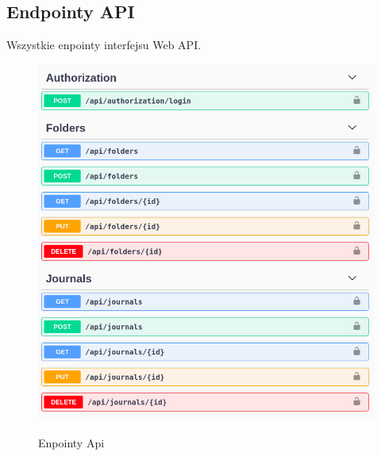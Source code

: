 \documentclass[a4paper,11pt]{report}
\begin{document}
\subsection{Endpointy API}
Wszystkie enpointy interfejsu Web API.
\begin{figure}[H]
	\centering
	\includegraphics[scale=0.5]{implementacja/backend/auth_folders_journals_api}\\
	\caption{Enpointy Api}
	\label{fig:auth_folders_journals_api}
\end{figure}
\end{document}
